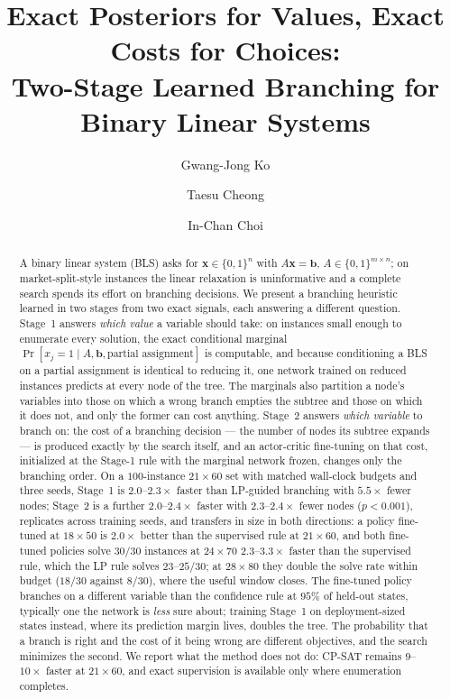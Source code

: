 \documentclass[final,5p,times,twocolumn]{elsarticle}
\begin{document}
\begin{frontmatter}

\title{Exact Posteriors for Values, Exact Costs for Choices:\\
Two-Stage Learned Branching for Binary Linear Systems}

\author[ku]{Gwang-Jong Ko}
\author[ku]{Taesu Cheong}
\author[ku]{In-Chan Choi}

\begin{abstract}
A binary linear system (BLS) asks for $\mathbf{x}\in\{0,1\}^n$ with $A\mathbf{x}=\mathbf{b}$, $A\in\{0,1\}^{m\times n}$; on market-split-style instances the linear relaxation is uninformative and a complete search spends its effort on branching decisions. We present a branching heuristic learned in two stages from two exact signals, each answering a different question. Stage~1 answers \emph{which value} a variable should take: on instances small enough to enumerate every solution, the exact conditional marginal $\Pr[x_j{=}1\mid A,\mathbf{b},\text{partial assignment}]$ is computable, and because conditioning a BLS on a partial assignment is identical to reducing it, one network trained on reduced instances predicts at every node of the tree. The marginals also partition a node's variables into those on which a wrong branch empties the subtree and those on which it does not, and only the former can cost anything. Stage~2 answers \emph{which variable} to branch on: the cost of a branching decision --- the number of nodes its subtree expands --- is produced exactly by the search itself, and an actor-critic fine-tuning on that cost, initialized at the Stage-1 rule with the marginal network frozen, changes only the branching order. On a $100$-instance $21\times60$ set with matched wall-clock budgets and three seeds, Stage~1 is $2.0$--$2.3\times$ faster than LP-guided branching with $5.5\times$ fewer nodes; Stage~2 is a further $2.0$--$2.4\times$ faster with $2.3$--$2.4\times$ fewer nodes ($p<0.001$), replicates across training seeds, and transfers in size in both directions: a policy fine-tuned at $18\times50$ is $2.0\times$ better than the supervised rule at $21\times60$, and both fine-tuned policies solve $30/30$ instances at $24\times70$ $2.3$--$3.3\times$ faster than the supervised rule, which the LP rule solves $23$--$25/30$; at $28\times80$ they double the solve rate within budget ($18/30$ against $8/30$), where the useful window closes. The fine-tuned policy branches on a different variable than the confidence rule at $95\%$ of held-out states, typically one the network is \emph{less} sure about; training Stage~1 on deployment-sized states instead, where its prediction margin lives, doubles the tree. The probability that a branch is right and the cost of it being wrong are different objectives, and the search minimizes the second. We report what the method does not do: CP-SAT remains $9$--$10\times$ faster at $21\times60$, and exact supervision is available only where enumeration completes.

\end{abstract}
\end{frontmatter}
\end{document}
